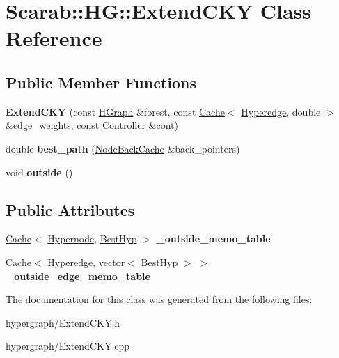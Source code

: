 \hypertarget{classScarab_1_1HG_1_1ExtendCKY}{
\section{Scarab::HG::ExtendCKY Class Reference}
\label{classScarab_1_1HG_1_1ExtendCKY}
}
\subsection*{Public Member Functions}
\begin{DoxyCompactItemize}
\item 
\hypertarget{classScarab_1_1HG_1_1ExtendCKY_a393c61229e019cb875ba6b7b6b176aff}{
{\bfseries ExtendCKY} (const \hyperlink{classScarab_1_1HG_1_1HGraph}{HGraph} \&forest, const \hyperlink{classCache}{Cache}$<$ \hyperlink{classScarab_1_1HG_1_1Hyperedge}{Hyperedge}, double $>$ \&edge\_\-weights, const \hyperlink{classScarab_1_1HG_1_1Controller}{Controller} \&cont)}
\label{classScarab_1_1HG_1_1ExtendCKY_a393c61229e019cb875ba6b7b6b176aff}

\item 
\hypertarget{classScarab_1_1HG_1_1ExtendCKY_ae72fa6e6e0bb69464c575bd5225b1423}{
double {\bfseries best\_\-path} (\hyperlink{classCache}{NodeBackCache} \&back\_\-pointers)}
\label{classScarab_1_1HG_1_1ExtendCKY_ae72fa6e6e0bb69464c575bd5225b1423}

\item 
\hypertarget{classScarab_1_1HG_1_1ExtendCKY_a038f64197127bc278e6a25c4565c72bd}{
void {\bfseries outside} ()}
\label{classScarab_1_1HG_1_1ExtendCKY_a038f64197127bc278e6a25c4565c72bd}

\end{DoxyCompactItemize}
\subsection*{Public Attributes}
\begin{DoxyCompactItemize}
\item 
\hypertarget{classScarab_1_1HG_1_1ExtendCKY_a008898035d6c06258e25a502fbfd7377}{
\hyperlink{classCache}{Cache}$<$ \hyperlink{classScarab_1_1HG_1_1Hypernode}{Hypernode}, \hyperlink{classScarab_1_1HG_1_1BestHyp}{BestHyp} $>$ {\bfseries \_\-outside\_\-memo\_\-table}}
\label{classScarab_1_1HG_1_1ExtendCKY_a008898035d6c06258e25a502fbfd7377}

\item 
\hypertarget{classScarab_1_1HG_1_1ExtendCKY_a554aa074d56b38acb561fda8584b9b8a}{
\hyperlink{classCache}{Cache}$<$ \hyperlink{classScarab_1_1HG_1_1Hyperedge}{Hyperedge}, vector$<$ \hyperlink{classScarab_1_1HG_1_1BestHyp}{BestHyp} $>$ $>$ {\bfseries \_\-outside\_\-edge\_\-memo\_\-table}}
\label{classScarab_1_1HG_1_1ExtendCKY_a554aa074d56b38acb561fda8584b9b8a}

\end{DoxyCompactItemize}


The documentation for this class was generated from the following files:\begin{DoxyCompactItemize}
\item 
hypergraph/ExtendCKY.h\item 
hypergraph/ExtendCKY.cpp\end{DoxyCompactItemize}

